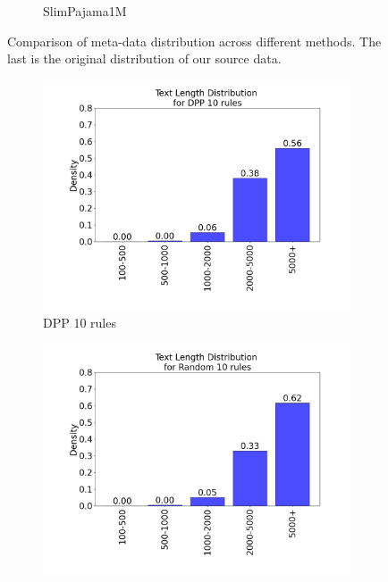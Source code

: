 \documentclass{article}
\begin{document}
\begin{figure}[H]
\begin{subfigure}{0.30\textwidth}
    \caption{SlimPajama1M}
\end{subfigure}

\caption{Comparison of meta-data distribution across different methods. The last is the original distribution of our source data.} %
\label{fig:data_distribution_Code_meta}
\end{figure}


\begin{figure}[H]
\centering

\begin{subfigure}{0.32\textwidth}
    \includegraphics[width=\linewidth]{figures/IMDB_data_length_distribution_plots/data_length_distribution_ft_10rules_dpp.png}
    \caption{DPP 10 rules}
\end{subfigure}\hfill
\begin{subfigure}{0.32\textwidth}
    \includegraphics[width=\linewidth]{figures/IMDB_data_length_distribution_plots/data_length_distribution_ft_10rules_randomC.png}

\end{subfigure}
\end{figure}
\end{document}
